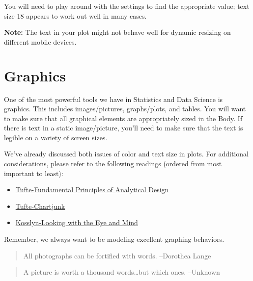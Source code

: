 \documentclass[
]{book}
\providecommand{\tightlist}{%
  \setlength{\itemsep}{0pt}\setlength{\parskip}{0pt}}
\begin{document}
You will need to play around with the settings to find the appropriate value; text size 18 appears to work out well in many cases.

\textbf{Note:} The text in your plot might not behave well for dynamic resizing on different mobile devices.

\hypertarget{graphics}{%
\section{Graphics}\label{graphics}}

One of the most powerful tools we have in Statistics and Data Science is graphics. This includes images/pictures, graphs/plots, and tables. You will want to make sure that all graphical elements are appropriately sized in the Body. If there is text in a static image/picture, you'll need to make sure that the text is legible on a variety of screen sizes.

We've already discussed both issues of color and text size in plots. For additional considerations, please refer to the following readings (ordered from most important to least):

\begin{itemize}
\tightlist
\item
  \href{https://www.dropbox.com/s/hb52991v09p8q91/Tufte\%20-\%202006\%20-\%20The\%20Fundamental\%20principles\%20of\%20analytical\%20design.pdf?dl=0}{Tufte-Fundamental Principles of Analytical Design}
\item
  \href{https://www.dropbox.com/s/z8yrf4eqph6c2h4/Tufte\%20-\%202001\%20-\%20Chartjunk\%20Vibrations\%2C\%20grids\%2C\%20and\%20ducks.pdf?dl=0}{Tufte-Chartjunk}\\
\item
  \href{https://www.dropbox.com/s/62uegsribwdjtze/Kosslyn\%20-\%202006\%20-\%20Looking\%20with\%20the\%20eye\%20and\%20mind.pdf?dl=0}{Kosslyn-Looking with the Eye and Mind}
\end{itemize}

Remember, we always want to be modeling excellent graphing behaviors.

\begin{quote}
All photographs can be fortified with words. --Dorothea Lange
\end{quote}

\begin{quote}
A picture is worth a thousand words\ldots but which ones. --Unknown
\end{quote}
\end{document}

